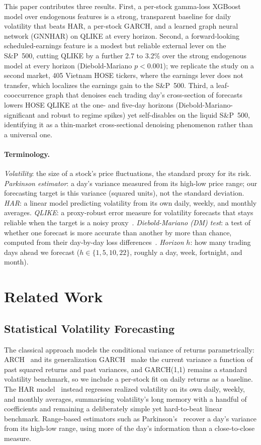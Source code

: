 \documentclass[runningheads]{llncs}
\begin{document}
This paper contributes three results. First, a per-stock gamma-loss XGBoost model over endogenous
features is a strong, transparent baseline for daily volatility that beats HAR, a per-stock
GARCH, and a learned graph neural network (GNNHAR) on QLIKE at every horizon. Second, a forward-looking
scheduled-earnings feature is a modest but reliable external lever on the S\&P~500, cutting QLIKE by a
further 2.7 to 3.2\% over the strong endogenous model at every horizon (Diebold-Mariano $p<0.001$); we
replicate the study on a second market, 405 Vietnam HOSE tickers, where the earnings lever does not
transfer, which localizes the earnings gain to the S\&P~500. Third, a leaf-cooccurrence graph that
denoises each trading day's cross-section of forecasts lowers HOSE QLIKE at the one- and five-day
horizons (Diebold-Mariano-significant and robust to regime spikes) yet self-disables on the liquid
S\&P~500,
identifying it as a thin-market cross-sectional denoising phenomenon rather than a universal one.

\paragraph{Terminology.}
\emph{Volatility}: the size of a stock's price fluctuations, the standard proxy for its risk.
\emph{Parkinson estimator}: a day's variance measured from its high-low price range; our forecasting
target is this variance (squared units), not the standard deviation.
\emph{HAR}: a linear model predicting volatility from its own daily, weekly, and monthly averages.
\emph{QLIKE}: a proxy-robust error measure for volatility forecasts that stays reliable when the
target is a noisy proxy~\cite{patton2011}.
\emph{Diebold-Mariano (DM) test}: a test of whether one forecast is more accurate than another by
more than chance, computed from their day-by-day loss differences~\cite{dm1995}.
\emph{Horizon} $h$: how many trading days ahead we forecast ($h\in\{1,5,10,22\}$, roughly a day, week,
fortnight, and month).

\section{Related Work}

\subsection{Statistical Volatility Forecasting}
The classical approach models the conditional variance of returns parametrically: ARCH~\cite{engle1982}
and its generalization GARCH~\cite{bollerslev1986} make the current variance a function of past squared
returns and past variances, and GARCH(1,1) remains a standard volatility benchmark, so we include a
per-stock fit on daily returns as a baseline. The HAR model~\cite{corsi2009} instead regresses realized
volatility on its own daily, weekly, and monthly averages, summarising volatility's long memory with a
handful of coefficients and remaining a deliberately simple yet hard-to-beat linear benchmark. Range-based
estimators such as Parkinson's~\cite{parkinson1980} recover a day's variance from its high-low range,
using more of the day's information than a close-to-close measure.
\end{document}

